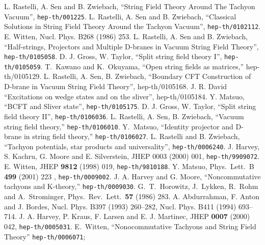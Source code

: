 \documentclass[a4paper,12pt]{article}
\begin{document}
\begin{thebibliography}{99}
 L. Rastelli, A. Sen and B. Zwiebach,
``String Field Theory Around The Tachyon Vacuum'',
{\tt hep-th/001225}.
 L. Rastelli, A. Sen and B. Zwiebach,
``Classical Solutions in String Field Theory Around
the Tachyon Vacuum'', {\tt hep-th/0102112}.
 E. Witten, 
Nucl. Phys. B268 (1986) 253.
 L. Rastelli, A. Sen and B. Zwiebach,
``Half-strings, Projectors and Multiple D-branes in Vacuum String
Field Theory'', {\tt hep-th/0105058}.
 D. J. Gross, W. Taylor,
``Split string field theory I'', {\tt hep-th/0105059}.
 T.~Kawano and K.~Okuyama,
``Open string fields as matrices,''
hep-th/0105129.
 L. Rastelli, A. Sen, B. Zwiebach,
``Boundary CFT Construction of D-brane in Vacuum String
Field Theory'', hep-th/0105168.
 J. R. David 
``Excitations on wedge states and on the sliver'',
hep-th/0105184.
 Y. Matsuo, ``BCFT and Sliver state'',
{\tt hep-th/0105175}.
 D. J. Gross, W. Taylor,
``Split string field theory II'', {\tt hep-th/0106036}.
 L. Rastelli, A. Sen, B. Zwiebach,
``Vacuum string field theory,''
{\tt hep-th/0106010}.
Y.~Matsuo, ``Identity projector and D-brane in string field theory,''
{\tt hep-th/0106027}.
 L. Rastelli and B. Zwiebach, ``Tachyon
potentials, star products and universality'', {\tt hep-th/0006240}.
 J. Harvey, S. Kachru, G. Moore and E. Silverstein,
JHEP 0003 (2000) 001, {\tt  hep-th/9909072}.
 E. Witten, %
JHEP {\bf 9812} (1998) 019, {\tt hep-th/9810188}.
 Y. Matsuo, 
Phys.\ Lett.\ B {\bf 499} (2001) 223
, {\tt hep-th/0009002}.
 J. A. Harvey and G. Moore,
``Noncommutative tachyons and K-theory,''
{\tt hep-th/0009030}.
 G.~T.~Horowitz, J.~Lykken, R.~Rohm and A.~Strominger,
Phys.\ Rev.\ Lett.\  {\bf 57} (1986) 283.
 A. Abdurrahman, F. Anton and J. Bordes,
Nucl. Phys. B397 (1993) 260--282, Nucl. Phys. B411 (1994) 693--714.
 J. A. Harvey, P. Kraus, F. Larsen and E. J. Martinec,
JHEP {\bf 0007} (2000) 042, {\tt hep-th/0005031}.
 E.~Witten,
``Nonocommutative Tachyons and String Field Theory''
{\tt hep-th/0006071};\\

\end{thebibliography}
\end{document}
